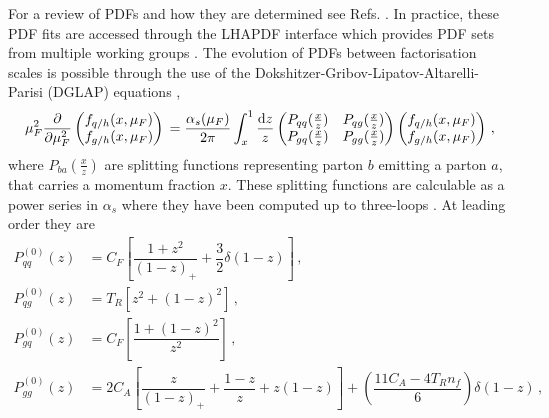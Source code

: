 \documentclass[main.tex]{subfiles}
\begin{document}
    For a review of PDFs and how they are determined
    see Refs. \cite{Ethier:2020way,Jimenez-Delgado:2013sma}.
    In practice, these PDF fits are accessed through the
    LHAPDF interface \cite{Buckley:2014ana} which provides
    PDF sets from multiple working groups \cite{PDF4LHCWorkingGroup:2022cjn,Hou:2019efy,Bailey:2020ooq,NNPDF:2021njg}.
    The evolution of PDFs between factorisation scales is possible
    through the use of the Dokshitzer-Gribov-Lipatov-Altarelli-Parisi (DGLAP)
    equations \cite{Dokshitzer:1977sg,Gribov:1972ri,Lipatov:1974qm,Altarelli:1977zs},
    \begin{equation}\label{eqn:DGLAP}
        \mu_{F}^{2} \dfrac{\partial}{\partial \mu_{F}^{2}}
        \begin{pmatrix}
            f_{q/h}(x,\mu_{F}) \\
            f_{g/h}(x,\mu_{F})
        \end{pmatrix} \\
        = \dfrac{\alpha_{s}(\mu_{F})}{2\pi} \int_{x}^{1} \dfrac{\mathrm{d}z}{z}
        \begin{pmatrix}
            P_{qq}(\frac{x}{z}) & P_{qg}(\frac{x}{z}) \\
            P_{gq}(\frac{x}{z}) & P_{gg}(\frac{x}{z})
        \end{pmatrix}
        \begin{pmatrix}
            f_{q/h}(x,\mu_{F}) \\
            f_{g/h}(x,\mu_{F})
        \end{pmatrix} \, ,
    \end{equation}
    where $P_{ba}(\frac{x}{z})$ are splitting functions
    representing parton $b$ emitting a parton $a$, that carries
    a momentum fraction $x$. These splitting functions are calculable
    as a power series in $\alpha_{s}$ where they have been computed
    up to three-loops \cite{Moch:2004pa,Vogt:2004mw}.
    At leading order they are \cite{Altarelli:1977zs}
    \begin{equation}\label{eqn:AP_kernels}
        \begin{split}
            P^{(0)}_{qq}(z) &= C_{F}\left[\dfrac{1+z^{2}}{(1-z)_{+}} + \dfrac{3}{2}\delta(1-z)\right] \, , \\
            P^{(0)}_{qg}(z) &= T_{R}\left[z^{2} + (1-z)^{2}\right] \, ,\\
            P^{(0)}_{gq}(z) &= C_{F}\left[\dfrac{1+(1-z)^{2}}{z^{2}}\right] \, ,\\
            P^{(0)}_{gg}(z) &= 2C_{A}\left[\dfrac{z}{(1-z)_{+}}+\dfrac{1-z}{z}+z(1-z)\right] + \left(\dfrac{11C_{A}-4T_{R}n_{f}}{6}\right)\delta(1-z) \, ,
        \end{split}
    \end{equation}
\end{document}
